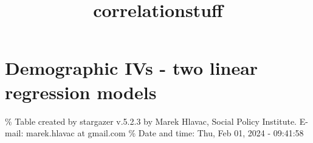 \documentclass[
]{article}
\title{correlationstuff}
\author{}
\date{\vspace{-2.5em}}
\begin{document}
\maketitle

{
\setcounter{tocdepth}{2}
\tableofcontents
}
\newpage

\hypertarget{demographic-ivs---two-linear-regression-models}{%
\section{Demographic IVs - two linear regression
models}\label{demographic-ivs---two-linear-regression-models}}

\begingroup\setlength{\tabcolsep}{1pt}\renewcommand{\arraystretch}{0.7}

\% Table created by stargazer v.5.2.3 by Marek Hlavac, Social Policy
Institute. E-mail: marek.hlavac at gmail.com \% Date and time: Thu, Feb
01, 2024 - 09:41:58
\end{document}
